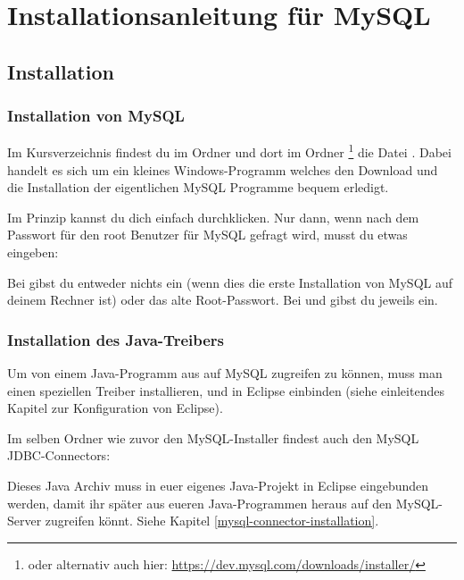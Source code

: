 \section{Installationsanleitung für MySQL}

\subsection{Installation}

\subsubsection{Installation von MySQL}

Im Kursverzeichnis findest du im Ordner  und dort
im Ordner \footnote{oder alternativ auch hier:
\url{https://dev.mysql.com/downloads/installer/}} die Datei
. Dabei handelt es sich um
ein kleines Windows-Programm welches den Download und die Installation der
eigentlichen MySQL Programme bequem erledigt.

Im Prinzip kannst du dich einfach durchklicken. Nur dann, wenn nach dem Passwort
für den root Benutzer für MySQL gefragt wird, musst du etwas eingeben: 

Bei  gibst du entweder nichts ein (wenn dies die
erste Installation von MySQL auf deinem Rechner ist) oder das alte
Root-Passwort. Bei  und  gibst
du jeweils  ein.


\subsubsection{Installation des Java-Treibers}

Um von einem Java-Programm aus auf MySQL zugreifen zu können, muss man einen speziellen Treiber
installieren, und in Eclipse einbinden (siehe einleitendes Kapitel zur
Konfiguration von Eclipse).

Im selben Ordner wie zuvor den MySQL-Installer findest auch den MySQL
JDBC-Connectors:


Dieses Java Archiv muss in euer eigenes Java-Projekt in Eclipse eingebunden
werden, damit ihr später aus eueren Java-Programmen heraus auf den MySQL-Server
zugreifen könnt. Siehe Kapitel \ref{mysql-connector-installation}.


